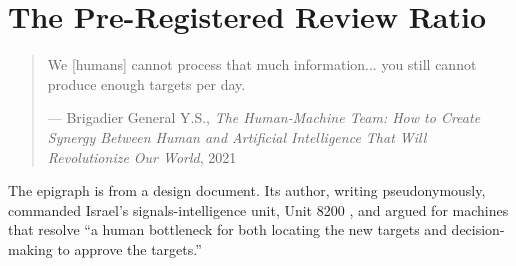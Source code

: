 \chapter{The Pre-Registered Review Ratio}
\label{sec:7}
\begin{quote}
We [humans] cannot process that much information... you still cannot produce enough targets per day.

— Brigadier General Y.S., \emph{The Human-Machine Team: How to Create Synergy Between Human and Artificial Intelligence That Will Revolutionize Our World}, 2021 \autocite{ys2021humanmachine}
\end{quote}

The epigraph is from a design document. Its author, writing pseudonymously, commanded Israel's signals-intelligence unit, Unit 8200 \autocite{davies2024sariel}, and argued for machines that resolve “a human bottleneck for both locating the new targets and decision-making to approve the targets.”
